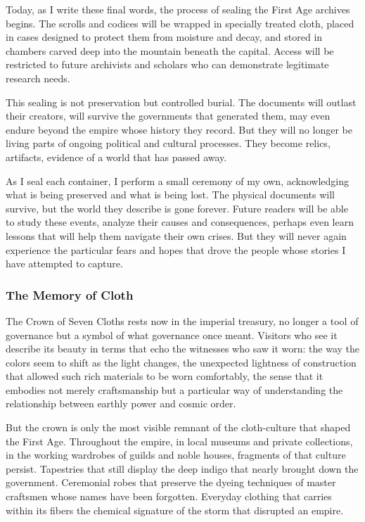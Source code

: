 Today, as I write these final words, the process of sealing the First
Age archives begins. The scrolls and codices will be wrapped in
specially treated cloth, placed in cases designed to protect them from
moisture and decay, and stored in chambers carved deep into the mountain
beneath the capital. Access will be restricted to future archivists and
scholars who can demonstrate legitimate research needs.

This sealing is not preservation but controlled burial. The documents
will outlast their creators, will survive the governments that generated
them, may even endure beyond the empire whose history they record. But
they will no longer be living parts of ongoing political and cultural
processes. They become relics, artifacts, evidence of a world that has
passed away.

As I seal each container, I perform a small ceremony of my own,
acknowledging what is being preserved and what is being lost. The
physical documents will survive, but the world they describe is gone
forever. Future readers will be able to study these events, analyze
their causes and consequences, perhaps even learn lessons that will help
them navigate their own crises. But they will never again experience the
particular fears and hopes that drove the people whose stories I have
attempted to capture.

\subsubsection{The Memory of Cloth}\label{the-memory-of-cloth}

The Crown of Seven Cloths rests now in the imperial treasury, no longer
a tool of governance but a symbol of what governance once meant.
Visitors who see it describe its beauty in terms that echo the witnesses
who saw it worn: the way the colors seem to shift as the light changes,
the unexpected lightness of construction that allowed such rich
materials to be worn comfortably, the sense that it embodies not merely
craftsmanship but a particular way of understanding the relationship
between earthly power and cosmic order.

But the crown is only the most visible remnant of the cloth-culture that
shaped the First Age. Throughout the empire, in local museums and
private collections, in the working wardrobes of guilds and noble
houses, fragments of that culture persist. Tapestries that still display
the deep indigo that nearly brought down the government. Ceremonial
robes that preserve the dyeing techniques of master craftsmen whose
names have been forgotten. Everyday clothing that carries within its
fibers the chemical signature of the storm that disrupted an empire.

